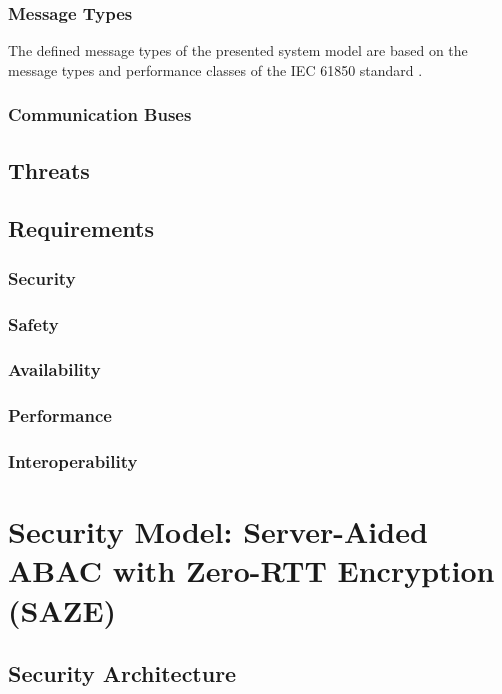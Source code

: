 \subsubsection{Message Types}
The defined message types of the presented system model are based on the message types and performance classes of the IEC 61850 standard \cite{IEC61850P5}.

\subsubsection{Communication Buses}

\subsection{Threats}

\subsection{Requirements}
\subsubsection{Security}
\subsubsection{Safety}
\subsubsection{Availability}
\subsubsection{Performance}
\subsubsection{Interoperability}

\section{Security Model: Server-Aided ABAC with Zero-RTT Encryption (SAZE)}
\label{sec:approach:security_model}
\subsection{Security Architecture}
